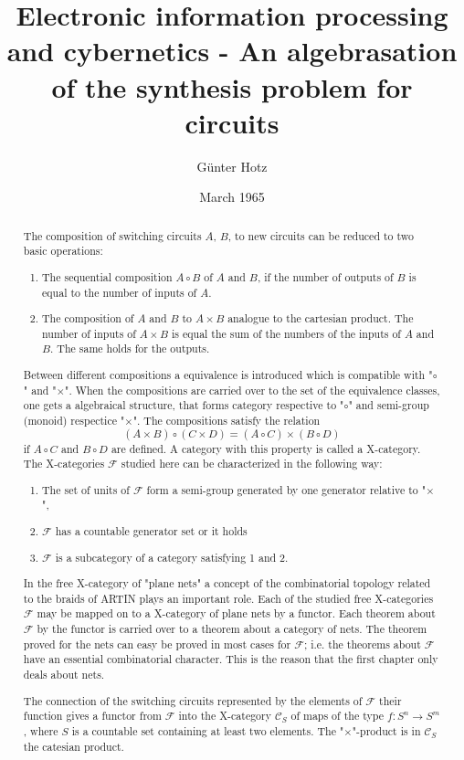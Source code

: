 \documentclass{article}
\begin{document}
\setcounter{section}{-1}

\title{Electronic information processing and cybernetics - An algebrasation of the synthesis problem for circuits}
\author{G\"{u}nter Hotz}
\date{March 1965}

\maketitle
\begin{abstract}
  The composition of switching circuits $A$, $B$, to new circuits can be reduced to two basic operations:
  \begin{enumerate}
    \item The sequential composition $A \circ B$ of $A$ and $B$, if the number of outputs of $B$ is equal to the number of inputs of $A$. 
    \item The composition of $A$ and $B$ to $A\times B$ analogue to the cartesian product. The number of inputs of $A\times B$ is equal the sum of the numbers of the inputs of $A$ and $B$. The same holds for the outputs.
  \end{enumerate}
  Between different compositions a equivalence is introduced which is compatible with "$\circ$" and "$\times$". When the compositions are carried over to the set of the equivalence classes, one gets a algebraical structure, that forms category respective to "$\circ$" and semi-group (monoid) respectice "$\times$". The compositions satisfy the relation
  \[ (A\times B) \circ (C \times D) = (A \circ C) \times (B \circ D) \]
  if $A\circ C$ and $B\circ D$ are defined. A category with this property is called a X-category.
  The X-categories $\mathcal{F}$ studied here can be characterized in the following way:
  \begin{enumerate}
  \item The set of units of $\mathcal{F}$ form a semi-group generated by one generator relative to "$\times$",
  \item $\mathcal{F}$ has a countable generator set or it holds
  \item $\mathcal{F}$ is a subcategory of a category satisfying 1 and 2.
  \end{enumerate}

    In the free X-category of "plane nets" a concept of the combinatorial topology related to the braids of ARTIN plays an important role. Each of the studied free X-categories $\mathcal{F}$ may be mapped on to a X-category of plane nets by a functor. Each theorem about $\mathcal{F}$ by the functor is carried over to a theorem about a category of nets. The theorem proved for the nets can easy be proved in most cases for $\mathcal{F}$; i.e. the theorems about $\mathcal{F}$ have an essential
    combinatorial character. This is the reason that the first chapter only deals about nets.

    The connection of the switching circuits represented by the elements of $\mathcal{F}$ their function gives a functor from $\mathcal{F}$ into the X-category $\mathcal{C}_S$ of maps of the type $f: S^n \rightarrow S^m$, where $S$ is a countable set containing at least two elements. The "$\times$"-product is in $\mathcal{C}_S$ the catesian product.
\end{abstract}
\end{document}

